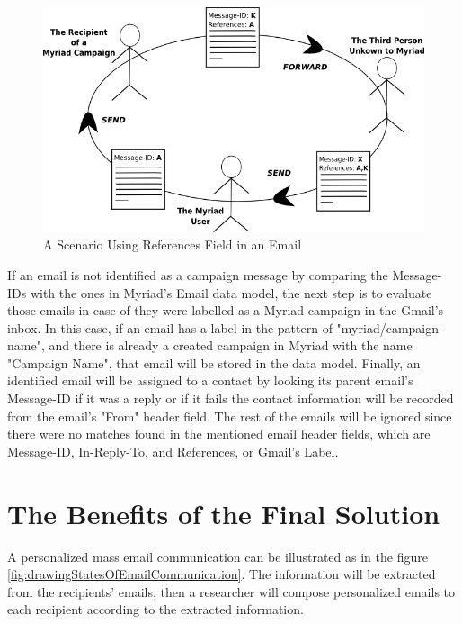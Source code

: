 \begin{figure}[htbp]
	\centering
	\includegraphics[width=1.00\textwidth]{imgs/drawingMessageReferences.png}
	\caption[A Scenario Using References Field in an Email]{A Scenario Using References Field in an Email}
	\label{fig:drawingMessageReferences}
\end{figure}

If an email is not identified as a campaign message by comparing the Message-IDs with the ones in Myriad's Email data model, the next step is to evaluate those emails in case of they were labelled as a Myriad campaign in the Gmail's inbox. In this case, if an email has a label in the pattern of "myriad/campaign-name", and there is already a created campaign in Myriad with the name "Campaign Name", that email will be stored in the data model. Finally, an identified email will be assigned to a contact by looking its parent email's Message-ID if it was a reply or if it fails the contact information will be recorded from the email's "From" header field. The rest of the emails will be ignored since there were no matches found in the mentioned email header fields, which are Message-ID, In-Reply-To, and References, or Gmail's Label.

\section{The Benefits of the Final Solution}
\label{sec:5.4:BeneFinaSolu}

A personalized mass email communication can be illustrated as in the figure \ref{fig:drawingStatesOfEmailCommunication}. The information will be extracted from the recipients' emails, then a researcher will compose personalized emails to each recipient according to the extracted information.

